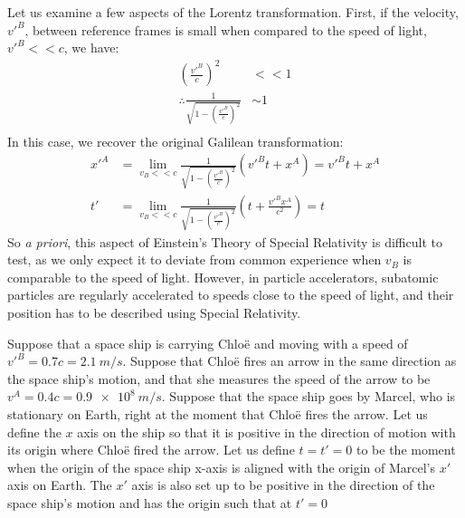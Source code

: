Let us examine a few aspects of the Lorentz transformation. First, if the velocity, $v'^B$, between reference frames is small when compared to the speed of light, $v'^B<<c$, we have:
\begin{align*}
\left(\frac{v'^B}{c}\right)^2&<<1\\
\therefore \frac{1}{\sqrt{1-\left(\frac{v'^B}{c}\right)^2}} &\sim 1 \\
\end{align*}
In this case, we recover the original Galilean transformation:
\begin{align*}
x'^A&=\lim_{v_B<<c}\frac{1}{\sqrt{1-\left(\frac{v'^B}{c}\right)^2}}(v'^Bt+x^A)=v'^Bt+x^A\\
t'&=\lim_{v_B<<c}\frac{1}{\sqrt{1-\left(\frac{v'^B}{c}\right)^2}}\left(  t+\frac{v'^Bx^A}{c^2} \right)=t
\end{align*}
So \textit{a priori}, this aspect of Einstein's Theory of Special Relativity is difficult to test, as we only expect it to deviate from common experience when $v_B$ is comparable to the speed of light. However, in particle accelerators, subatomic particles are regularly accelerated to speeds close to the speed of light, and their position has to be described using Special Relativity. 

Suppose that a space ship is carrying Chlo\"e and moving with a speed of $v'^B=0.7c=\SI{2.1}{m/s}$. Suppose that Chlo\"e fires an arrow in the same direction as the space ship's motion, and that she measures the speed of the arrow to be $v^A=0.4c=\SI{0.9e8}{m/s}$. Suppose that the space ship goes by Marcel, who is stationary on Earth, right at the moment that Chlo\"e fires the arrow. Let us define the $x$ axis on the ship so that it is positive in the direction of motion with its origin where  Chlo\"e fired the arrow. Let us define $t=t'=0$ to be the moment when the origin of the space ship x-axis is aligned with the origin of Marcel's $x'$ axis on Earth. The $x'$ axis is also set up to be positive in the direction of the space ship's motion and has the origin such that at $t'=0$

